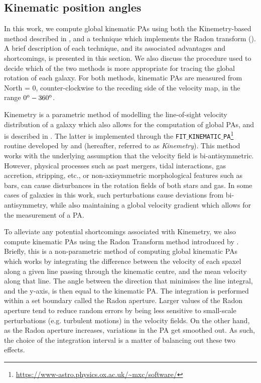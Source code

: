 \documentclass[fleqn,usenatbib]{mnras}
\begin{document}

\subsection{Kinematic position angles}
\label{sec:PAs_measurements}

In this work, we compute global kinematic PAs using both the Kinemetry-based method described in \cite{Krajnovic2006Kinemetry}, and a technique which implements the Radon transform (\citealt{Stark2018Radon}). A brief description of each technique, and its associated advantages and shortcomings, is presented in this section. We also discuss the procedure used to decide which of the two methods is more appropriate for tracing the global rotation of each galaxy. For both methods, kinematic PAs are measured from North = 0, counter-clockwise to the receding side of the velocity map, in the range $0^{\rm{o}}-360^{\rm{o}}$.

Kinemetry is a parametric method of modelling the line-of-sight velocity distribution of a galaxy which also allows for the computation of global PAs, and is described in \cite{Krajnovic2006Kinemetry}. The latter is implemented through the \texttt{FIT$\_$KINEMATIC$\_$PA}\footnote{\url{https://www-astro.physics.ox.ac.uk/~mxc/software/}} routine developed by \cite{Cappellari2007} and \cite{Krajnovic2011} (hereafter, referred to as \textit{Kinemetry}). This method works with the underlying assumption that the velocity field is bi-antisymmetric. However, physical processes such as past mergers, tidal interactions, gas accretion, stripping, etc., or non-axisymmetric morphological features such as bars, can cause disturbances in the rotation fields of both stars and gas. In some cases of galaxies in this work, such perturbations cause deviations from bi-antisymmetry, while also maintaining a global velocity gradient which allows for the measurement of a PA. 

To alleviate any potential shortcomings associated with Kinemetry, we also compute kinematic PAs using the Radon Transform method introduced by \cite{Stark2018Radon}. Briefly, this is a non-parametric method of computing global kinematic PAs which works by integrating the difference between the velocity of each spaxel along a given line passing through the kinematic centre, and the mean velocity along that line. The angle between the direction that minimises the line integral, and the y-axis, is then equal to the kinematic PA. The integration is performed within a set boundary called the Radon aperture. Larger values of the Radon aperture tend to reduce random errors by being less sensitive to small-scale perturbations (e.g. turbulent motions) in the velocity fields. On the other hand, as the Radon aperture increases, variations in the PA get smoothed out. As such, the choice of the integration interval is a matter of balancing out these two effects. 
\end{document}
